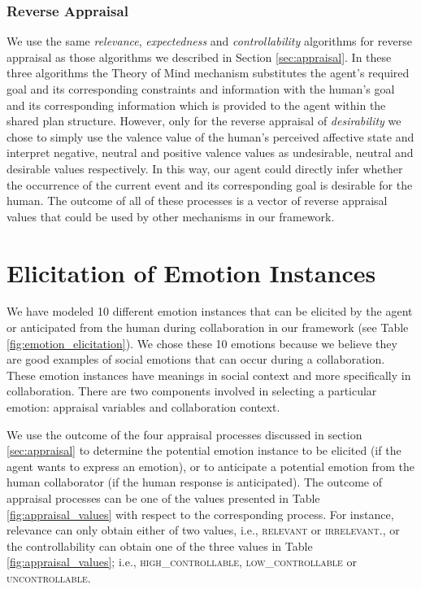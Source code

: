 \documentclass[12pt]{report}
\begin{document}
\subsubsection{Reverse Appraisal}
We use the same \textit{relevance}, \textit{expectedness} and
\textit{controllability} algorithms for reverse appraisal as those
algorithms we described in Section \ref{sec:appraisal}. In these three
algorithms the Theory of Mind mechanism substitutes the agent's required goal
and its corresponding constraints and information with the human's goal and its
corresponding information which is provided to the agent within the shared plan
structure.  However, only for the reverse appraisal of \textit{desirability} we
chose to simply use the valence value of the human's perceived affective state and
interpret negative, neutral and positive valence values as undesirable, neutral
and desirable values respectively. In this way, our agent could directly infer
whether the occurrence of the current event and its corresponding goal is
desirable for the human. The outcome of all of these processes is a vector of
reverse appraisal values that could be used by other mechanisms in our
framework.

\section{Elicitation of Emotion Instances}
We have modeled 10 different emotion instances that can be elicited by the agent
or anticipated from the human during collaboration in our framework (see Table
\ref{fig:emotion_elicitation}). We chose these 10 emotions because
we believe they are good examples of social emotions that can occur during a
collaboration. These emotion instances have meanings in social context and more
specifically in collaboration. There are two components involved in selecting a
particular emotion: appraisal variables and collaboration context.

We use the outcome of the four appraisal processes discussed in section
\ref{sec:appraisal} to determine the potential emotion instance to be elicited
(if the agent wants to express an emotion), or to anticipate a potential emotion
from the human collaborator (if the human response is anticipated). The outcome
of appraisal processes can be one of the values presented in Table
\ref{fig:appraisal_values} with respect to the corresponding process.
For instance, relevance can only obtain either of two values,
i.e., \textsc{relevant} or \textsc{irrelevant}., or the controllability can
obtain one of the three values in Table \ref{fig:appraisal_values}; i.e.,
\textsc{high\_controllable, low\_controllable} or \textsc{uncontrollable}.
\end{document}
